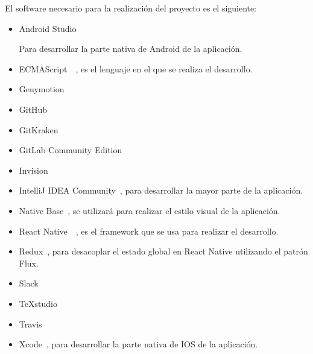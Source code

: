  El software necesario para la realización del proyecto es el siguiente:
\begin{itemize}
	\item Android Studio~\cite{ASTUDIO}
	
	Para desarrollar la parte nativa de Android de la aplicación.
	
	\item ECMAScript~\cite{ECMA}~\cite{ECMABOOK}, es el lenguaje en el que se realiza el desarrollo.
	\item Genymotion
	\item GitHub
	\item GitKraken
	\item GitLab Community Edition
	\item Invision
	\item IntelliJ IDEA Community~\cite{IDEA}, para desarrollar la mayor parte de la aplicación.
	\item Native Base~\cite{NABA}, se utilizará para realizar el estilo visual de la aplicación.
	\item React Native~\cite{RENA}~\cite{REACTBOOK}, es el framework que se usa para realizar el desarrollo.
	\item Redux~\cite{REDUX}, para desacoplar el estado global en React Native utilizando el patrón Flux.
	\item Slack
	\item TeXstudio
	\item Travis
	\item Xcode~\cite{XCODE}, para desarrollar la parte nativa de IOS de la aplicación.
\end{itemize}

